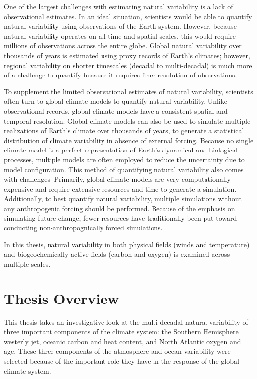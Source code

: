 One of the largest challenges with estimating natural variability is a lack of
observational estimates. In an ideal situation, scientists would be able to quantify
natural variability using observations of the Earth system. However, because natural
variability operates on all time and spatial scales, this would require millions
of observations across the entire globe. Global natural variability over thousands
of years is estimated using proxy records of Earth's climates; however, regional
variability on shorter timescales (decadal to multi-decadal) is much more of a
challenge to quantify because it requires finer resolution of observations.

To supplement the limited observational estimates of natural variability, scientists
often turn to global climate models to quantify natural variability. Unlike
observational records, global climate models have a consistent spatial and temporal
resolution. Global climate models can also be used to simulate multiple realizations
of Earth's climate over thousands of years, to generate a statistical distribution
of climate variability in absence of external forcing. Because no single climate
model is a perfect representation of Earth's dynamical and biological processes,
multiple models are often employed to reduce the uncertainty due to model configuration.
This method of quantifying natural variability also comes with challenges. Primarily,
global climate models are very computationally expensive and require extensive
resources and time to generate a simulation. Additionally, to best quantify
natural variability, multiple simulations without any anthropogenic forcing should
be performed. Because of the emphasis on simulating future change, fewer resources
have traditionally been put toward conducting non-anthropognically forced simulations.

In this thesis, natural variability in both physical fields (winds and temperature)
and biogeochemically active fields (carbon and oxygen) is examined across multiple scales.


\section{Thesis Overview}
This thesis takes an investigative look at the multi-decadal natural variability
of three important components of the climate system: the Southern Hemisphere
westerly jet, oceanic carbon and heat content, and North Atlantic oxygen and age.
These three components of the atmosphere and ocean variability were selected
because of the important role they have in the response of the global climate system.

